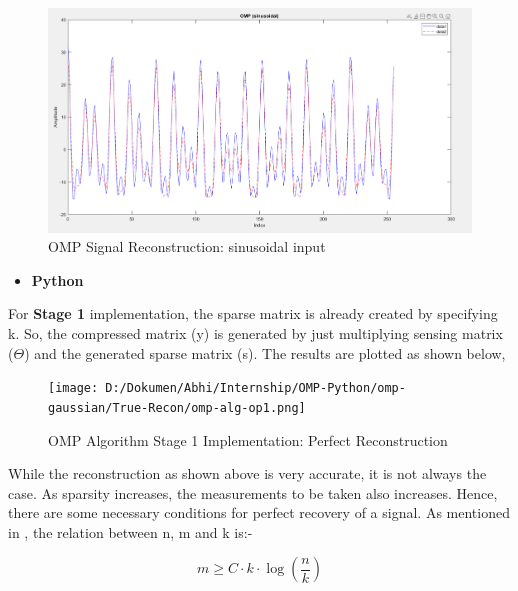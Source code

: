 \documentclass[
  letterpaper,
  DIV=11,
  numbers=noendperiod]{scrartcl}
\providecommand{\tightlist}{%
  \setlength{\itemsep}{0pt}\setlength{\parskip}{0pt}}
\begin{document}
\begin{figure}[H]

{\centering \includegraphics[width=0.8\linewidth,height=\textheight,keepaspectratio]{abar-cs_files/mediabag/omp_sine1.png}

}

\caption{OMP Signal Reconstruction: sinusoidal input}

\end{figure}%

\begin{itemize}
\tightlist
\item
  \textbf{Python}
\end{itemize}

For \textbf{Stage 1} implementation, the sparse matrix is already
created by specifying k. So, the compressed matrix (y) is generated by
just multiplying sensing matrix (\(\Theta\)) and the generated sparse
matrix (s). The results are plotted as shown below,

\begin{figure}[H]

{\centering \texttt{[image: D:/Dokumen/Abhi/Internship/OMP-Python/omp-gaussian/True-Recon/omp-alg-op1.png]}

}

\caption{OMP Algorithm Stage 1 Implementation: Perfect Reconstruction}

\end{figure}%

While the reconstruction as shown above is very accurate, it is not
always the case. As sparsity increases, the measurements to be taken
also increases. Hence, there are some necessary conditions for perfect
recovery of a signal. As mentioned in \autocite{rani-cs}, the relation
between n, m and k is:-

\begin{equation}
\boxed{
    m \geq C \cdot k \cdot \log\left(\frac{n}{k}\right)
}
\end{equation}
\end{document}
